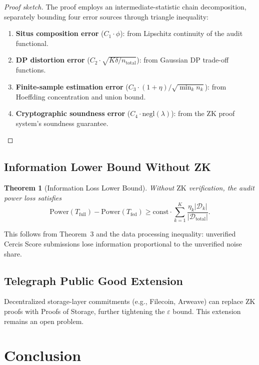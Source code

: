 \documentclass[12pt,a4paper]{article}
\newtheorem{theorem}{Theorem}[section]
\newcommand{\cD}{\mathcal{D}}
\newcommand{\ZK}{\mathrm{ZK}}
\newcommand{\negl}{\mathrm{negl}}
\newcommand{\Power}{\mathrm{Power}}
\begin{document}
\begin{proof}[Proof sketch]
The proof employs an intermediate-statistic chain decomposition, separately bounding four error sources through triangle inequality:
\begin{enumerate}
    \item \textbf{Situs composition error} ($C_1\cdot\phi$): from Lipschitz continuity of the audit functional.
    \item \textbf{DP distortion error} ($C_2\cdot\sqrt{K\delta/n_{\text{total}}}$): from Gaussian DP trade-off functions.
    \item \textbf{Finite-sample estimation error} ($C_3\cdot(1+\eta)/\sqrt{\min_k n_k}$): from Hoeffding concentration and union bound.
    \item \textbf{Cryptographic soundness error} ($C_4\cdot\negl(\lambda)$): from the ZK proof system's soundness guarantee.
\end{enumerate}
\end{proof}

\subsection{Information Lower Bound Without ZK}

\begin{theorem}[Information Loss Lower Bound]
\label{thm:info-lower}
Without $\ZK$ verification, the audit power loss satisfies
\[
\Power(T_{\mathrm{full}}) - \Power(T_{\mathrm{fed}}) \geq \mathrm{const} \cdot \sum_{k=1}^K \frac{\eta_k |\cD_k|}{|\cD_{\mathrm{total}}|}.
\]
\end{theorem}

This follows from Theorem~3 and the data processing inequality: unverified Cercis Score submissions lose information proportional to the unverified noise share.

\subsection{Telegraph Public Good Extension}
\label{sec:telegraph}

Decentralized storage-layer commitments (e.g., Filecoin, Arweave) can replace $\ZK$ proofs with Proofs of Storage, further tightening the $\varepsilon$ bound. This extension remains an open problem.

\section{Conclusion}
\end{document}
